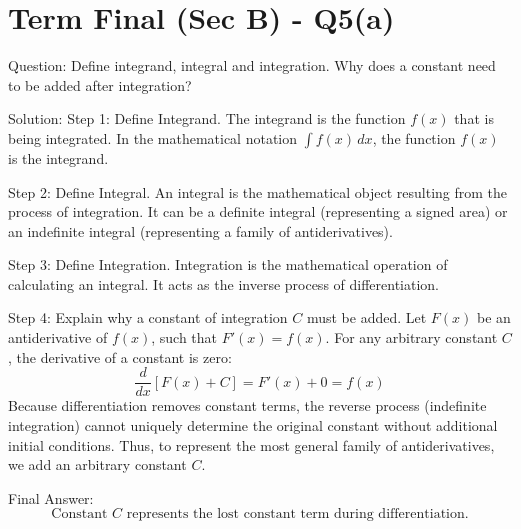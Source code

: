 \documentclass{article}
\begin{document}
\section*{Term Final (Sec B) - Q5(a)}
Question:
Define integrand, integral and integration. Why does a constant need to be added after integration?

Solution:
Step 1: Define Integrand.
The integrand is the function $f(x)$ that is being integrated. In the mathematical notation $\int f(x) \, dx$, the function $f(x)$ is the integrand.

Step 2: Define Integral.
An integral is the mathematical object resulting from the process of integration. It can be a definite integral (representing a signed area) or an indefinite integral (representing a family of antiderivatives).

Step 3: Define Integration.
Integration is the mathematical operation of calculating an integral. It acts as the inverse process of differentiation.

Step 4: Explain why a constant of integration $C$ must be added.
Let $F(x)$ be an antiderivative of $f(x)$, such that $F'(x) = f(x)$. For any arbitrary constant $C$, the derivative of a constant is zero:
\[
\frac{d}{dx} [F(x) + C] = F'(x) + 0 = f(x)
\]
Because differentiation removes constant terms, the reverse process (indefinite integration) cannot uniquely determine the original constant without additional initial conditions. Thus, to represent the most general family of antiderivatives, we add an arbitrary constant $C$.

Final Answer:
\[
\boxed{\text{Constant } C \text{ represents the lost constant term during differentiation.}}
\]

\end{document}
